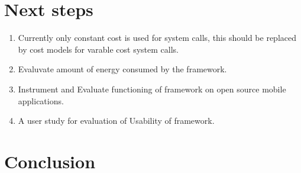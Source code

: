 \section{Next steps}

\begin{enumerate}

\item Currently only constant cost is used for system calls, this should be replaced by cost models for varable cost system calls.
\item Evaluvate amount of energy consumed by the framework.
\item Instrument and Evaluate functioning of framework on open source mobile applications.
\item A user study for evaluation of Usability of framework. 

\end{enumerate}


\section{Conclusion}
\label{conclusion}




